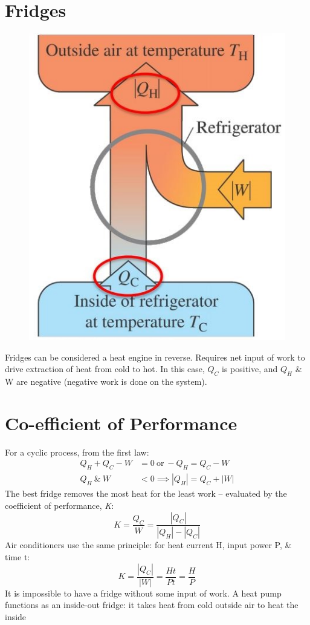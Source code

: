 \documentclass[a4paper, 11pt, normalem]{report}
\begin{document}
\section{Fridges}
\begin{figure}
    \centering
    \includegraphics[scale=0.7]{Fridge.jpg}
\end{figure}
Fridges can be considered a heat engine in reverse.
Requires net input of work to drive extraction of heat from cold to hot.
In this case, $Q_{C}$ is positive, and $Q_{H}$ \& W are negative (negative work is done on the system).

\section{Co-efficient of Performance}
For a cyclic process, from the first law:
\begin{align}
    Q_{H} + Q_{C} - W &= 0 ~\text{or}~ -Q_{H} = Q_{C} - W \\
    Q_{H} ~\&~ W &< 0 \implies |Q_{H}| = Q_{C} + |W|
\end{align}
The best fridge removes the most heat for the least work -- evaluated by the coefficient of performance, \emph{K}:
\begin{equation}
	K = \frac{Q_{C}}{W} = \frac{|Q_{C}|}{|Q_{H}| - |Q_{C}|}
\end{equation}
Air conditioners use the same principle: for heat current H, input power P, \& time t:
\begin{equation}
	K = \frac{|Q_{C}|}{|W|} = \frac{Ht}{Pt} = \frac{H}{P}
\end{equation}
It is impossible to have a fridge without some input of work.
A heat pump functions as an inside-out fridge: it takes heat from cold outside air to heat the inside
\end{document}
